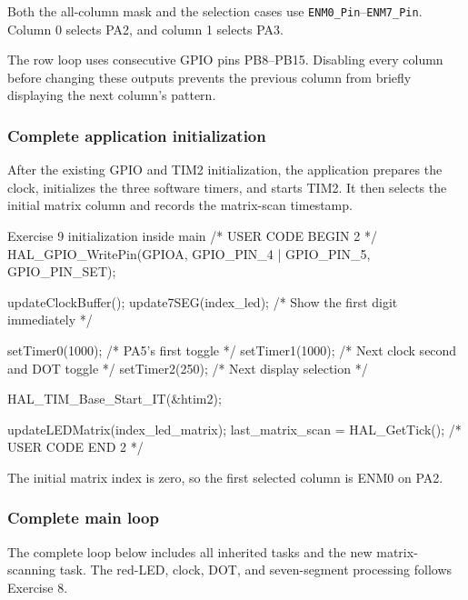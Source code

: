 \documentclass[a4paper]{article}
\begin{document}
Both the all-column mask and the selection
cases use \texttt{ENM0\_Pin}--\texttt{ENM7\_Pin}.
Column 0 selects PA2, and column 1 selects PA3.

The row loop uses consecutive GPIO pins
PB8--PB15. Disabling every column before
changing these outputs prevents the previous
column from briefly displaying the next
column's pattern.

\subsubsection{Complete application initialization}

After the existing GPIO and TIM2 initialization,
the application prepares the clock, initializes
the three software timers, and starts TIM2.
It then selects the initial matrix column
and records the matrix-scan timestamp.

\begin{stmcode}{Exercise 9 initialization inside main}
/* USER CODE BEGIN 2 */
HAL_GPIO_WritePin(GPIOA, GPIO_PIN_4 | GPIO_PIN_5, GPIO_PIN_SET);

updateClockBuffer();
update7SEG(index_led); /* Show the first digit immediately */

setTimer0(1000); /* PA5's first toggle */
setTimer1(1000); /* Next clock second and DOT toggle */
setTimer2(250);  /* Next display selection */

HAL_TIM_Base_Start_IT(&htim2);

updateLEDMatrix(index_led_matrix);
last_matrix_scan = HAL_GetTick();
/* USER CODE END 2 */
\end{stmcode}

The initial matrix index is zero, so the
first selected column is ENM0 on PA2.

\subsubsection{Complete main loop}

The complete loop below includes all inherited
tasks and the new matrix-scanning task.
The red-LED, clock, DOT, and seven-segment
processing follows Exercise 8.
\end{document}
